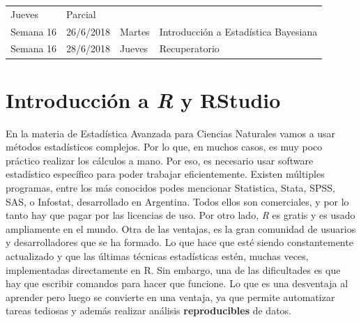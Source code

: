 \documentclass[]{book}
\theoremstyle{definition}
\theoremstyle{definition}
\theoremstyle{definition}
\theoremstyle{remark}
\begin{document}
\begin{longtable}[]{@{}llll@{}}
\begin{minipage}[t]{0.05\columnwidth}
Jueves\strut
\end{minipage} & \begin{minipage}[t]{0.69\columnwidth}\raggedright
Parcial\strut
\end{minipage}\tabularnewline
\begin{minipage}[t]{0.07\columnwidth}\raggedright
Semana 16\strut
\end{minipage} & \begin{minipage}[t]{0.07\columnwidth}\raggedright
26/6/2018\strut
\end{minipage} & \begin{minipage}[t]{0.05\columnwidth}\raggedright
Martes\strut
\end{minipage} & \begin{minipage}[t]{0.69\columnwidth}\raggedright
Introducción a Estadística Bayesiana\strut
\end{minipage}\tabularnewline
\begin{minipage}[t]{0.07\columnwidth}\raggedright
Semana 16\strut
\end{minipage} & \begin{minipage}[t]{0.07\columnwidth}\raggedright
28/6/2018\strut
\end{minipage} & \begin{minipage}[t]{0.05\columnwidth}\raggedright
Jueves\strut
\end{minipage} & \begin{minipage}[t]{0.69\columnwidth}\raggedright
Recuperatorio\strut
\end{minipage}\tabularnewline
\bottomrule
\end{longtable}

\hypertarget{introduccion-a-r-y-rstudio}{%
\chapter{\texorpdfstring{Introducción a \emph{R} y
RStudio}{Introducción a R y RStudio}}\label{introduccion-a-r-y-rstudio}}

En la materia de Estadística Avanzada para Ciencias Naturales vamos a
usar métodos estadísticos complejos. Por lo que, en muchos casos, es muy
poco práctico realizar los cálculos a mano. Por eso, es necesario usar
software estadístico específico para poder trabajar eficientemente.
Existen múltiples programas, entre los más conocidos podes mencionar
Statistica, Stata, SPSS, SAS, o Infostat, desarrollado en Argentina.
Todos ellos son comerciales, y por lo tanto hay que pagar por las
licencias de uso. Por otro lado, \emph{R} es gratis y es usado
ampliamente en el mundo. Otra de las ventajas, es la gran comunidad de
usuarios y desarrolladores que se ha formado. Lo que hace que esté
siendo constantemente actualizado y que las últimas técnicas
estadísticas estén, muchas veces, implementadas directamente en R. Sin
embargo, una de las dificultades es que hay que escribir comandos para
hacer que funcione. Lo que es una desventaja al aprender pero luego se
convierte en una ventaja, ya que permite automatizar tareas tediosas y
además realizar análisis \textbf{reproducibles} de datos.
\end{document}
